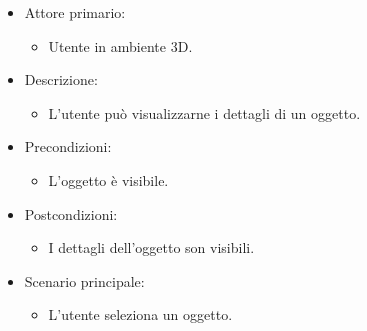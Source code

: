 \begin{itemize}
	
	\item Attore primario: 
	\begin{itemize}
		\item Utente in ambiente 3D.
	\end{itemize}
	\item Descrizione:
	\begin{itemize}
		\item L'utente può visualizzarne i dettagli di un oggetto.
	\end{itemize}
	
	\item Precondizioni:
	\begin{itemize}
		\item L'oggetto è visibile.
	\end{itemize}
	
	\item Postcondizioni:
	\begin{itemize}
		\item I dettagli dell'oggetto son visibili.
	\end{itemize}
	
	\item Scenario principale:
	\begin{itemize}
		\item L'utente seleziona un oggetto.
	\end{itemize}
	
\end{itemize}

